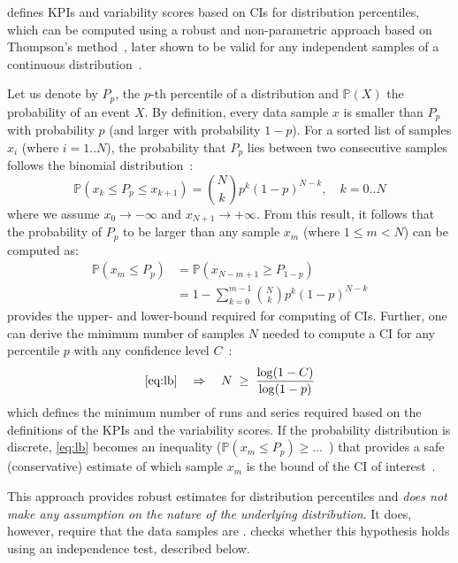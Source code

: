 \triscale defines KPIs and variability scores based on CIs for distribution percentiles, which can be computed using a robust and non-parametric approach based on Thompson's method~\cite{thompson1936Confidence}, later shown to be valid for any independent samples of a continuous distribution~\cite{david2005Order}.

Let us denote by $P_p$, the $p$-th percentile of a distribution and $\mathbb{P}(X)$ the probability of an event $X$.
By definition, every data sample $x$ is smaller than $P_p$ with probability $p$ (and larger with probability $1-p$).
For a sorted list of \iid samples $x_i$ (where $i = 1 .. N$), the probability that $P_p$ lies between two consecutive samples follows the binomial distribution~\cite{thompson1936Confidence}:
\begin{equation}
    \mathbb{P}(x_k \leq P_p \leq x_{k+1}) = \binom{N}{k} p^k(1-p)^{N-k}, \quad k = 0 .. N
\end{equation}
where we assume $x_0 \rightarrow - \infty$ and $x_{N+1} \rightarrow +\infty$. From this result, it follows that the probability of $P_p$ to be larger than any sample $x_m$ (where $1\leq m < N$) can be computed as:
\begin{align}
  \nonumber
    \mathbb{P}(x_m \leq P_p)
      &= \mathbb{P}(x_{N-m+1} \geq P_{1-p})\\
  \label{eq:lb}
      &= 1 - \sum_{k=0}^{m-1} \binom{N}{k} p^k(1-p)^{N-k}
\end{align}
 provides the upper- and lower-bound required for computing of CIs.
Further, one can derive the minimum number of samples $N$ needed to compute a CI for any percentile $p$ with any confidence level $C$~\cite{schmid2014measuring}:
\begin{equation}
\label{eq:minN}
     \cref{eq:lb} \quad \Rightarrow \quad N \;\geq\; \frac{\log(1-C)}{\log(1-p)}
\end{equation}
which defines the minimum number of runs and series required based on the definitions of the KPIs and the variability scores.
If the probability distribution is discrete, \cref{eq:lb} becomes an inequality ($\mathbb{P}(x_m \leq P_p) \geq \ldots$~) that provides a safe (\ie conservative) estimate of which sample $x_m$ is the bound of the CI of interest~\cite{david2005Order}.


This approach provides robust estimates for distribution percentiles and \emph{does not make any assumption on the nature of the underlying distribution}.
It does, however, require that the data samples are \iid. \triscale checks whether this hypothesis holds using an independence test, described below.

